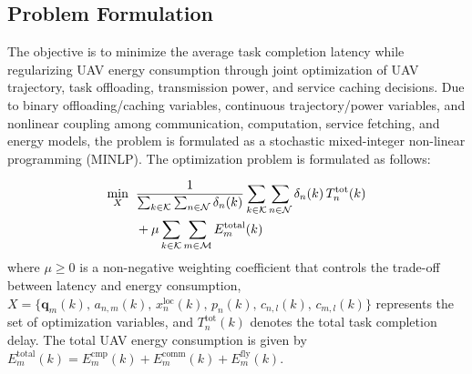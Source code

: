 \documentclass[journal]{IEEEtran}
\begin{document}
\subsection{Problem Formulation}
The objective is to minimize the average task completion latency while regularizing UAV energy consumption through joint optimization of UAV trajectory, task offloading, transmission power, and service caching decisions. Due to binary offloading/caching variables, continuous trajectory/power variables, and nonlinear coupling among communication, computation, service fetching, and energy models, the problem is formulated as a stochastic mixed-integer non-linear 
programming (MINLP). The optimization problem is formulated as follows:

\begin{equation}
\small
\begin{aligned}
\min_{X} \;\; 
& \frac{1}{\sum_{k\in\mathcal{K}}\sum_{n\in\mathcal{N}}\delta_n(k)}
\sum_{k\in\mathcal{K}}\sum_{n\in\mathcal{N}}
\delta_n(k)\,T_n^{\mathrm{tot}}(k) \\
& + \mu \sum_{k\in\mathcal{K}}\sum_{m\in\mathcal{M}}
E_m^{\mathrm{total}}(k)
\end{aligned}
\label{eq:problem_obj}
\end{equation}
where $\mu \geq 0$ is a non-negative weighting coefficient that controls the trade-off between latency and energy consumption, 
$X=\{\mathbf{q}_m(k),\,a_{n,m}(k),\,x_n^{\mathrm{loc}}(k),
\,p_n(k),\,c_{n,l}(k),\,c_{m,l}(k)\}$ represents the set of optimization 
variables, and $T_n^{\mathrm{tot}}(k)$ denotes the total task completion 
delay. The total UAV energy consumption is given by 
$E_m^{\mathrm{total}}(k)=E_m^{\mathrm{cmp}}(k)+E_m^{\mathrm{comm}}(k)
+E_m^{\mathrm{fly}}(k)$.
\end{document}
